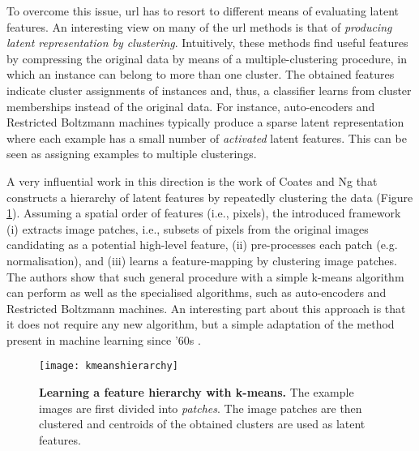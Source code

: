 To overcome this issue, \gls{url} has to resort to different means of evaluating latent features.
An interesting view on many of the \gls{url} methods is that of \textit{producing latent representation by clustering}.
Intuitively, these methods find useful features by compressing the original data by means of a  multiple-clustering procedure, in which an instance can belong to more than one cluster.
The obtained features indicate cluster assignments of instances and, thus, a classifier learns from cluster memberships instead of the original data.
For instance, auto-encoders and Restricted Boltzmann machines typically produce a sparse latent representation where each example has a small number of \textit{activated} latent features.
This can be seen as assigning examples to multiple clusterings.


A very influential work in this direction is the work of Coates and Ng \cite{coates2011analysis} that constructs a hierarchy of latent features by repeatedly clustering the data  (Figure \ref{fig:kmeansh}).
Assuming a spatial order of features (i.e., pixels), the introduced framework (i) extracts image patches, i.e., subsets of pixels from the original images candidating as a potential high-level feature, (ii) pre-processes each patch (e.g. normalisation), and (iii) learns a feature-mapping by clustering image patches.
The authors show that such general procedure with a simple k-means algorithm can perform as well as the specialised algorithms, such as auto-encoders and  Restricted Boltzmann machines.
An interesting part about this approach is that it does not require any new algorithm, but a simple adaptation of the method present in machine learning since '60s \cite{kmeans}.





\begin{figure}
	\medskip
	\centering
	\texttt{[image: kmeanshierarchy]}
	\caption[Learning a feature hierarchy with k-means]{\textbf{Learning a feature hierarchy with k-means.} The example images are first divided into \textit{patches}. The image patches are then clustered and centroids of the obtained clusters are used as latent features.}
	\label{fig:kmeansh}
\end{figure}



